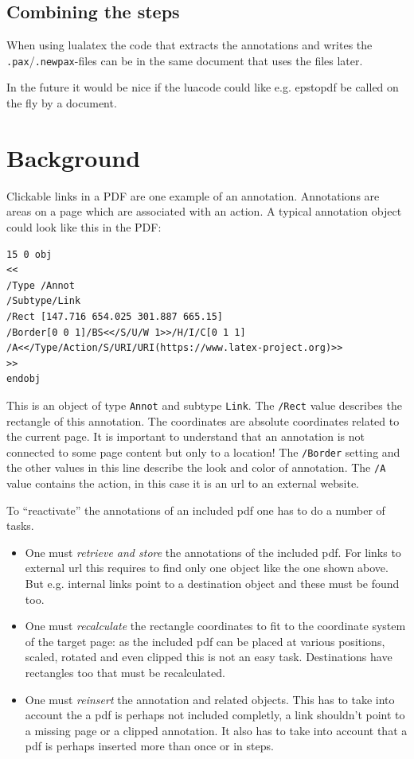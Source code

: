 \documentclass[DIV=12,parskip=half-,bibliography=totoc]{scrartcl}
\begin{document}
\subsection{Combining the steps}

When using lualatex the code that extracts the annotations and writes the \texttt{.pax}/\texttt{.newpax}-files can be in the same document that uses the files later.

In the future it would be nice if the luacode could like e.g. epstopdf be called on the fly by a document.

\section{Background}

Clickable links in a PDF are one example of an annotation. Annotations are areas on a page which are associated with an action. A typical annotation object could look like this in the PDF:

\begin{lstlisting}
15 0 obj
<<
/Type /Annot
/Subtype/Link
/Rect [147.716 654.025 301.887 665.15]
/Border[0 0 1]/BS<</S/U/W 1>>/H/I/C[0 1 1]
/A<</Type/Action/S/URI/URI(https://www.latex-project.org)>>
>>
endobj
\end{lstlisting}
This is an object of type \texttt{Annot} and subtype \texttt{Link}.
The \texttt{/Rect} value describes the rectangle of this annotation. The coordinates are absolute coordinates related to the current page. It is important to understand that an annotation is not connected to some page content but only to a location!
The \texttt{/Border} setting and the other values in this line describe the look and color of annotation. The \texttt{/A} value contains the action, in this case it is an url to an external website.


To \enquote{reactivate} the annotations of an included pdf one has to do a number of tasks.
\begin{itemize}
\item One must \emph{retrieve and store} the annotations of the included pdf. For links to external url this requires to find only one object like the one shown above. But e.g. internal links point to a destination object and these must be found too.
\item One must \emph{recalculate} the rectangle coordinates to fit to the coordinate system of the target page: as the included pdf can be placed at various positions, scaled, rotated and even clipped this is not an easy task. Destinations have rectangles too that must be recalculated.
\item  One must  \emph{reinsert} the annotation and related objects. This has to take into account the a pdf is perhaps not included completly, a link shouldn't point to a missing page or a clipped annotation. It also has to take into account that a pdf is perhaps inserted more than once or in steps.
\end{itemize}
\end{document}
